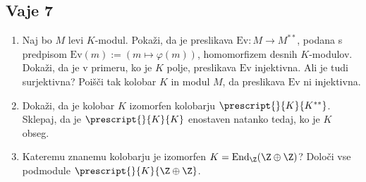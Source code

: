 \newpage
\subsection*{Vaje 7}

\begin{enumerate}
    \item Naj bo $M$ levi $K$-modul. Pokaži, da je preslikava $\text{Ev}: M \to M^{**}$,
    podana s predpisom $\text{Ev}(m) := (m \mapsto \varphi(m))$, homomorfizem desnih $K$-modulov.
    Dokaži, da je v primeru, ko je $K$ polje, preslikava $\text{Ev}$ injektivna. Ali je tudi
    surjektivna? Poišči tak kolobar $K$ in modul $M$, da preslikava $\text{Ev}$ ni injektivna.
    \item Dokaži, da je kolobar $K$ izomorfen kolobarju $\prescript{}{K}{K^{**}}$. Sklepaj, da je
    $\prescript{}{K}{K}$ enostaven natanko tedaj, ko je $K$ obseg.
    \item Kateremu znanemu kolobarju je izomorfen $K = \text{End}_{\Z}(\Z \oplus \Z)$? Določi
    vse podmodule $\prescript{}{K}{\Z \oplus \Z}$.
\end{enumerate}

%

%

%
